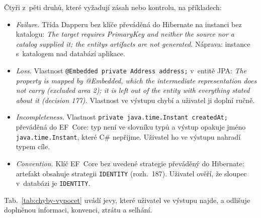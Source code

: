 
Čtyři z~pěti druhů, které vyžadují zásah nebo kontrolu, na příkladech:

\begin{itemize}[leftmargin=*,itemsep=1pt]
\item \emph{Failure.} Třída Dapperu bez klíče převáděná do Hibernate na instanci bez katalogu: \emph{The target requires PrimaryKey and neither the source nor a catalog supplied it; the entity\textquotesingle{}s artifacts are not generated.} Náprava: instance s~katalogem nad databází aplikace.
\item \emph{Loss.} Vlastnost \texttt{@Embedded private Address address;} v~entitě JPA: \emph{The property is mapped by @Embedded, which the intermediate representation does not carry (excluded area 2); it is left out of the entity with everything stated about it (decision 177).} Vlastnost ve výstupu chybí a uživatel ji doplní ručně.
\item \emph{Incompleteness.} Vlastnost \texttt{private java.time.Instant createdAt;} převáděná do EF~Core: typ není ve slovníku typů a výstup opakuje jméno \texttt{java.time.Instant}, které C\# nepřijme. Uživatel ho ve výstupu nahradí typem cíle.
\item \emph{Convention.} Klíč EF~Core bez uvedené strategie převáděný do Hibernate: artefakt obsahuje strategii \texttt{IDENTITY} (rozh.~187). Uživatel ověří, že sloupec v~databázi je \texttt{IDENTITY}.
\end{itemize}

Tab.~\ref{tab:chyby-vypocet} uvádí jevy, které uživatel ve výstupu najde, a odlišuje doplněnou informaci, konvenci, ztrátu a selhání.

